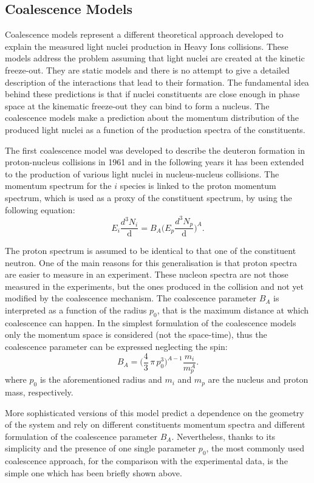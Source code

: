 %
\subsection{Coalescence Models} \label{sec:1.4.2}

Coalescence models represent a different theoretical approach developed to explain 
the measured light nuclei production in Heavy Ions collisions. 
These models address the problem assuming that light nuclei are created at the kinetic freeze-out. 
They are static models and there is no attempt to give a detailed description of the 
interactions that lead to their formation.
The fundamental idea behind these predictions is that if nuclei constituents are close enough in 
phase space at the kinematic freeze-out they can bind to form a nucleus. 
The coalescence models make a prediction about the momentum distribution of the produced light 
nuclei as a function of the production spectra of the constituents.

The first coalescence model was developed to describe the deuteron formation in
proton-nucleus collisions in 1961 \cite{coalefirst} and in the following years it has been extended to 
the production of various light nuclei in nucleus-nucleus collisions.
The momentum spectrum for the $i$ species is linked to the proton momentum spectrum,
which is used as a proxy of the constituent spectrum, by using the following equation:
\begin{equation}
    E_{i} \frac{d^{3}N_{i}}{\mathop{dp_{i}^{3}}} = B_{A} \Big( E_{p} \frac{d^{3}N_{p}}{\mathop{dp_{p}^{3}}} \Big)^{A}.
\end{equation}

The proton spectrum is assumed to be identical to that one of the constituent neutron.
One of the main reasons for this generalisation is that proton spectra are easier to measure
in an experiment.
These nucleon spectra are not those measured in the experiments, but the ones produced in the 
collision and not yet modified by the coalescence mechanism.
The coalescence parameter $B_{A}$ is interpreted as a function of the radius $p_{0}$, that 
is the maximum distance at which coalescence can happen.
In the simplest formulation of the coalescence models only the momentum space is considered
(not the space-time), thus the coalescence parameter can be expressed neglecting the spin:
\begin{equation} 
    B_{A} = \Big( \frac{4}{3}\, \pi \,p_{0}^3 \Big)^{A-1} \frac{m_{i}}{m_{p}^{A}}.
\end{equation}
where $p_{0}$ is the aforementioned radius and $m_{i}$ and $m_{p}$ are the nucleus and proton
mass, respectively.

More sophisticated versions of this model \cite{deuprod} predict a dependence on the geometry of the
system and rely on different constituents momentum spectra and different formulation of 
the coalescence parameter $B_{A}$. Nevertheless, thanks to its simplicity and the presence
of one single parameter $p_{0}$, the most commonly used coalescence approach, for the comparison with
the experimental data, is the simple one which has been briefly shown above.
